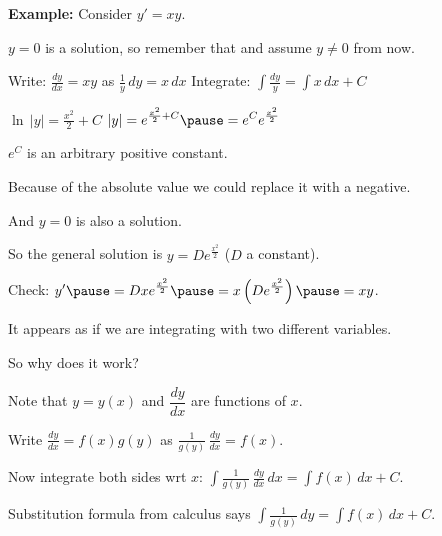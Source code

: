 \documentclass[10pt,aspectratio=169]{beamer}
\begin{document}
\begin{frame}

\textbf{Example:}
Consider
$y' = xy$.

\medskip
\pause

$y=0$ is a solution, so remember that and assume $y\not= 0$ from now.

\medskip
\pause

Write:
\qquad $\displaystyle \frac{dy}{dx} = xy$
\quad as \quad
$\displaystyle \frac{1}{y}\, dy = x \, dx$
\pause
\qquad Integrate:
$\displaystyle
\int \frac{dy}{y} = \int x\,dx + C$

\medskip
\pause

\thus
\quad
$\displaystyle
\ln \, \lvert y\rvert = \frac{x^2}{2} + C$
\pause
\wthus
$\displaystyle \lvert y \rvert = e^{\frac{x^2}{2} + C}
\pause
 = e^C e^{\frac{x^2}{2}}$

\medskip
\pause

$e^C$ is an arbitrary positive constant.

\pause
Because of the absolute value we could replace it with a negative.

\pause
And $y=0$ is also a solution.

\medskip
\pause

So the general solution is \quad $\displaystyle y = D e^{\frac{x^2}{2}}$
\quad ($D$ a constant).

\medskip
\pause

Check:
$\displaystyle
y' \pause = D x e^{\frac{x^2}{2}} \pause = x \left( D e^{\frac{x^2}{2}}
\right) \pause = xy$.
\qquad
{\Large\checkmark}
\end{frame}

\begin{frame}
It appears as if we are integrating with two different variables.

\medskip
\pause

So why does it work?

\medskip
\pause

Note that $y=y(x)$ and $\dfrac{dy}{dx}$ are functions of $x$.

\medskip
\pause

Write
\quad
$\displaystyle \frac{dy}{dx} = f(x)g(y)$
\quad
as
\quad
$\displaystyle
\frac{1}{g(y)}\,\frac{dy}{dx} = f(x)$.

\medskip
\pause

Now integrate both sides wrt $x$:
\quad
$\displaystyle
\int \frac{1}{g(y)}\,\frac{dy}{dx} \,dx = \int f(x) \,dx + C$.

\medskip
\pause

Substitution formula from calculus says
\quad $\displaystyle
\int \frac{1}{g(y)}\,dy = \int f(x) \,dx + C$.
\quad
{\Large\checkmark}

\end{frame}
\end{document}
